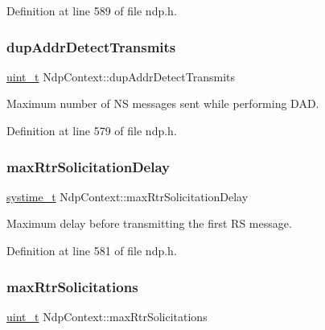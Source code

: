 Definition at line 589 of file ndp.\+h.

\mbox{\label{structNdpContext_a47458438d295650512e889531b1e0471}} 
\subsubsection{\texorpdfstring{dup\+Addr\+Detect\+Transmits}{dupAddrDetectTransmits}}
{\footnotesize\ttfamily \hyperlink{compiler__port_8h_a12a1e9b3ce141648783a82445d02b58d}{uint\+\_\+t} Ndp\+Context\+::dup\+Addr\+Detect\+Transmits}



Maximum number of NS messages sent while performing D\+AD. 



Definition at line 579 of file ndp.\+h.

\mbox{\label{structNdpContext_a5f21cd7b9fe8e523cd7b01d6274cb11c}} 
\subsubsection{\texorpdfstring{max\+Rtr\+Solicitation\+Delay}{maxRtrSolicitationDelay}}
{\footnotesize\ttfamily \hyperlink{compiler__port_8h_ae3e32a98d431a02106616da3071832dd}{systime\+\_\+t} Ndp\+Context\+::max\+Rtr\+Solicitation\+Delay}



Maximum delay before transmitting the first RS message. 



Definition at line 581 of file ndp.\+h.

\mbox{\label{structNdpContext_aceadc715ad12f0148cdba9acba96949a}} 
\subsubsection{\texorpdfstring{max\+Rtr\+Solicitations}{maxRtrSolicitations}}
{\footnotesize\ttfamily \hyperlink{compiler__port_8h_a12a1e9b3ce141648783a82445d02b58d}{uint\+\_\+t} Ndp\+Context\+::max\+Rtr\+Solicitations}



